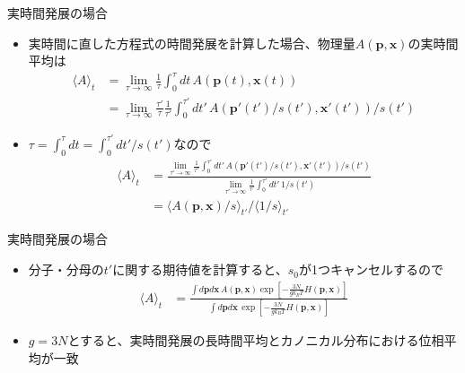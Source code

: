 \documentclass[dvipdfmx]{beamer}
\begin{document}
\begin{frame}[t,fragile]{実時間発展の場合}
  \begin{itemize}
  \item 実時間に直した方程式の時間発展を計算した場合、物理量$A(\mathbf{p},\mathbf{x})$の実時間平均は
    \begin{align*}
      \langle A \rangle_t &= \lim_{\tau\rightarrow\infty} \frac{1}{\tau} \int_0^\tau dt \, A(\mathbf{p}(t),\mathbf{x}(t)) \\
      &= \lim_{\tau\rightarrow\infty} \frac{\tau'}{\tau} \frac{1}{\tau'} \int_0^{\tau'} dt' \, A(\mathbf{p}'(t')/s(t'),\mathbf{x}'(t')) / s(t')
    \end{align*}
  \item $\tau = \int_0^{\tau} dt = \int_0^{\tau'} dt'/s(t')$なので
    \begin{align*}
      \langle A \rangle_t &= \frac{\lim_{\tau'\rightarrow\infty} \frac{1}{\tau'} \int_0^{\tau'} dt' \, A(\mathbf{p}'(t')/s(t'),\mathbf{x}'(t')) / s(t')}{\lim_{\tau'\rightarrow\infty} \frac{1}{\tau'} \int_0^{\tau'} dt' \, 1/ s(t')} \\
      &= \langle A(\mathbf{p},\mathbf{x}) / s \rangle_{t'} / \langle 1 / s \rangle_{t'}
    \end{align*}
  \end{itemize}
\end{frame}

\begin{frame}[t,fragile]{実時間発展の場合}
  \begin{itemize}
  \item 分子・分母の$t'$に関する期待値を計算すると、$s_0$が1つキャンセルするので
    \begin{align*}
      \langle A \rangle_t &= \frac{\int d\mathbf{p} d\mathbf{x} \, A(\mathbf{p},\mathbf{x}) \exp [ -\frac{3N}{gk_BT} H(\mathbf{p}, \mathbf{x})]}{\int d\mathbf{p} d\mathbf{x} \, \exp [ -\frac{3N}{gk_BT} H(\mathbf{p}, \mathbf{x})]}
    \end{align*}
    \item {\color{red}$g=3N$}とすると、実時間発展の長時間平均とカノニカル分布における位相平均が一致
  \end{itemize}
\end{frame}
\end{document}
